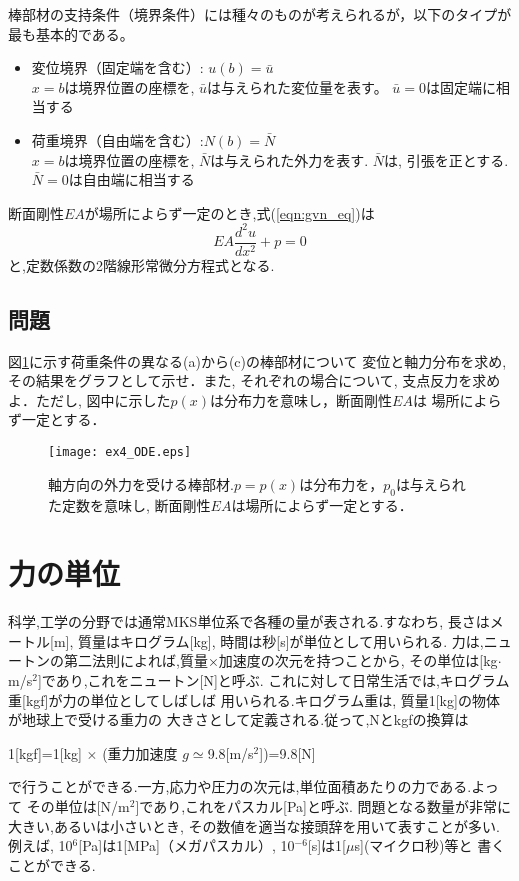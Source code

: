 \documentclass[10pt,a4j]{jbook}
\begin{document}
棒部材の支持条件（境界条件）には種々のものが考えられるが，以下のタイプが最も基本的である。
\begin{itemize}
\item
変位境界（固定端を含む）: $u(b)=\bar{u}$\\
	$x=b$は境界位置の座標を, $\bar u$は与えられた変位量を表す。
	$\bar u=0$は固定端に相当する
\item
荷重境界（自由端を含む）:$N(b)=\bar{N}$\\
	 $x=b$は境界位置の座標を, $\bar N$は与えられた外力を表す.
	$\bar{N}$は, 引張を正とする. $\bar N=0$は自由端に相当する
\end{itemize}
断面剛性$EA$が場所によらず一定のとき,式(\ref{eqn:gvn_eq})は
\begin{equation}
	EA\frac{d^2u}{dx^2}+p=0
	\label{eqn:gvn_eq2}
\end{equation}
と,定数係数の2階線形常微分方程式となる.
\subsection{問題}
図\ref{fig:fig4}に示す荷重条件の異なる(a)から(c)の棒部材について
変位と軸力分布を求め, その結果をグラフとして示せ．また, それぞれの場合について, 
支点反力を求めよ．ただし, 図中に示した$p(x)$は分布力を意味し，断面剛性$EA$は
場所によらず一定とする．
\begin{figure}[h]
	\begin{center}
	\texttt{[image: ex4\_ODE.eps]} 
	\end{center}
	\caption{軸方向の外力を受ける棒部材.$p=p(x)$は分布力を，$p_0$は与えられた定数を意味し, 
	断面剛性$EA$は場所によらず一定とする．} 
	\label{fig:fig4}
\end{figure}
\section{力の単位}
科学,工学の分野では通常MKS単位系で各種の量が表される.すなわち, 
長さはメートル[m], 質量はキログラム[kg], 時間は秒[s]が単位として用いられる.
力は,ニュートンの第二法則によれば,質量×加速度の次元を持つことから, 
その単位は[kg$\cdot$m/s$^2$]であり,これをニュートン[N]と呼ぶ.
これに対して日常生活では,キログラム重[kgf]が力の単位としてしばしば
用いられる.キログラム重は, 質量1[kg]の物体が地球上で受ける重力の
大きさとして定義される.従って,Nとkgfの換算は
\begin{center}
	1[kgf]=1[kg] $\times$ (重力加速度  $g\simeq$9.8[m/s$^2$])=9.8[N]
\end{center}
で行うことができる.一方,応力や圧力の次元は,単位面積あたりの力である.よって
その単位は[N/m$^2$]であり,これをパスカル[Pa]と呼ぶ.
問題となる数量が非常に大きい,あるいは小さいとき,
その数値を適当な接頭辞を用いて表すことが多い.例えば,
10$^6$[Pa]は1[MPa]（メガパスカル）, 10$^{-6}$[s]は1[$\mu$s](マイクロ秒)等と
書くことができる.
\clearpage
\end{document}
